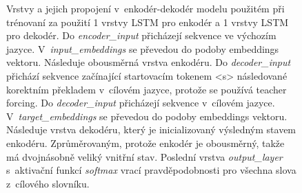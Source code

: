 \begin{figure}[H]
    \begin{center}
    \end{center}
	\caption{Vrstvy a jejich propojení v~enkodér-dekodér modelu použitém při trénovaní za použití 1 vrstvy LSTM pro enkodér a 1 vrstvy LSTM pro dekodér. Do \emph{encoder\_input} přicházejí sekvence ve výchozím jazyce. V~\emph{input\_embeddings} se převedou do podoby embeddings vektoru. Následuje obousměrná vrstva enkodéru. Do \emph{decoder\_input} přichází sekvence začínající startovacím tokenem <s> následované korektním překladem v~cílovém jazyce, protože se používá teacher forcing. Do \emph{decoder\_input} přicházejí sekvence v~cílovém jazyce. V~\emph{target\_embeddings} se převedou do podoby embeddings vektoru. Následuje vrstva dekodéru, který je inicializovaný výsledným stavem enkodéru. Zprůměrovaným, protože enkodér je obousměrný, takže má dvojnásobně veliký vnitřní stav. Poslední vrstva \emph{output\_layer} s~aktivační funkcí \emph{softmax} vrací pravděpodobnosti pro všechna slova z~cílového slovníku.}
	\label{img:model}
\end{figure}

